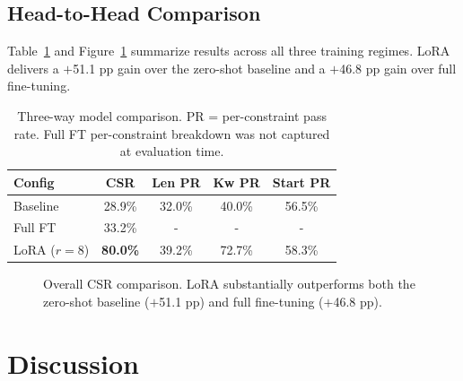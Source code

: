 \documentclass[10pt]{article}
\begin{document}
\subsection{Head-to-Head Comparison}

Table~\ref{tab:comparison} and Figure~\ref{fig:comparison_bar} summarize
results across all three training regimes. LoRA delivers a $+$51.1 pp gain
over the zero-shot baseline and a $+$46.8 pp gain over full fine-tuning.

\begin{table}[H]
\centering
\caption{Three-way model comparison. PR = per-constraint pass rate.
Full FT per-constraint breakdown was not captured at evaluation time.}
\label{tab:comparison}
\small
\begin{tabular}{lcccc}
\toprule
\textbf{Config} & \textbf{CSR} & \textbf{Len PR} & \textbf{Kw PR}
  & \textbf{Start PR} \\
\midrule
Baseline         & 28.9\%         & 32.0\% & 40.0\% & 56.5\% \\
Full FT          & 33.2\%         & -    & -    & -    \\
LoRA ($r{=}8$)   & \textbf{80.0\%}& 39.2\% & 72.7\% & 58.3\% \\
\bottomrule
\end{tabular}
\end{table}

\begin{figure}[htbp]
\centering
{}
\caption{Overall CSR comparison. LoRA substantially outperforms both
the zero-shot baseline ($+$51.1 pp) and full fine-tuning ($+$46.8 pp).}
\label{fig:comparison_bar}
\end{figure}

\section{Discussion}
\end{document}
